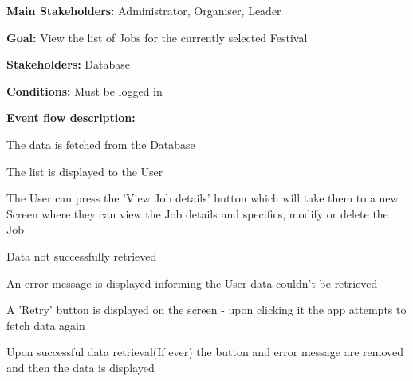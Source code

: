 				\noindent {}
				\begin{packed_item}
					\item \textbf{Main Stakeholders:} Administrator, Organiser, Leader
					\item \textbf{Goal:} View the list of Jobs for the currently selected Festival
					\item \textbf{Stakeholders: } Database
					\item \textbf{Conditions: } Must be logged in
					\item \textbf{Event flow description: }
					\begin{packed_enum}
						\item The data is fetched from the Database
						\item The list is displayed to the User
						\item The User can press the 'View Job details' button which will take them to a new Screen where they can view the Job details and specifics, modify or delete the Job
					\end{packed_enum}
					
					\begin{packed_item}
						\item[1.a] Data not successfully retrieved
						\item[] \begin{packed_enum}
							\item An error message is displayed informing the User data couldn't be retrieved
							\item A 'Retry' button is displayed on the screen - upon clicking it the app attempts to fetch data again
							\item Upon successful data retrieval(If ever) the button and error message are removed and then the data is displayed
						\end{packed_enum}
					\end{packed_item}
				\end{packed_item}
			
